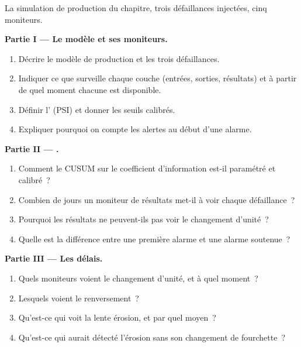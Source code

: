 \begin{problem}\label{pb:ml:monitoring-and-retraining:1}
La simulation de production du chapitre, trois défaillances injectées, cinq moniteurs.

\medskip\noindent\textbf{Partie I --- Le modèle et ses moniteurs.}
\begin{enumerate}
\item Décrire le modèle de production et les trois défaillances.
\item Indiquer ce que surveille chaque couche (entrées, sorties, résultats) et à partir de quel moment chacune est disponible.
\item Définir l' (PSI) et donner les seuils calibrés.
\item Expliquer pourquoi on compte les alertes au début d'une alarme.
\end{enumerate}

\medskip\noindent\textbf{Partie II --- .}
\begin{enumerate}[resume]
\item Comment le CUSUM sur le coefficient d'information est-il paramétré et calibré~?
\item Combien de jours un moniteur de résultats met-il à voir chaque défaillance~?
\item Pourquoi les résultats ne peuvent-ils pas voir le changement d'unité~?
\item Quelle est la différence entre une première alarme et une alarme soutenue~?
\end{enumerate}

\medskip\noindent\textbf{Partie III --- Les délais.}
\begin{enumerate}[resume]
\item Quels moniteurs voient le changement d'unité, et à quel moment~?
\item Lesquels voient le renversement~?
\item Qu'est-ce qui voit la lente érosion, et par quel moyen~?
\item Qu'est-ce qui aurait détecté l'érosion sans son changement de fourchette~?
\end{enumerate}


\end{problem}
